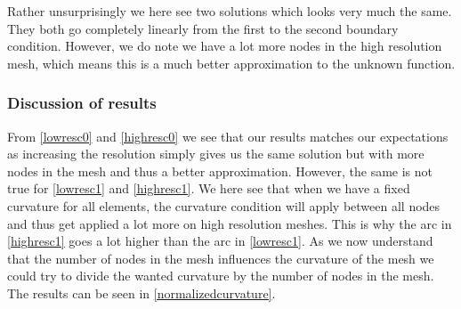 Rather unsurprisingly we here see two solutions which looks very much the same. They both go completely linearly from the first to the second boundary condition. However, we do note we have a lot more nodes in the high resolution mesh, which means this is a much better approximation to the unknown function.

\subsubsection{Discussion of results}
From \autoref{lowresc0} and \autoref{highresc0} we see that our results matches our expectations as increasing the resolution simply gives us the same solution but with more nodes in the mesh and thus a better approximation. However, the same is not true for \autoref{lowresc1} and \autoref{highresc1}. We here see that when we have a fixed curvature for all elements, the curvature condition will apply between all nodes and thus get applied a lot more on high resolution meshes. This is why the arc in \autoref{highresc1} goes a lot higher than the arc in \autoref{lowresc1}. As we now understand that the number of nodes in the mesh influences the curvature of the mesh we could try to divide the wanted curvature by the number of nodes in the mesh. The results can be seen in \autoref{normalizedcurvature}.
